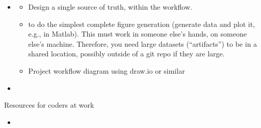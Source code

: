 \documentclass[letterpaper,10pt,english]{sphinxmanual}
\begin{document}
\begin{itemize}
\begin{description}
\begin{itemize}
\item {} 
\sphinxAtStartPar
Roughly 20\% of time “refactoring” (improving the code even if it’s working fine as is). An expression from software engineering is “technical debt”, the amount of disorganized clutter that slows future progress. How much time should you spend paying down technical debt (re\sphinxhyphen{}organizing your notes and directory structure, taking notes) versus producing results? This is called “refactoring”. We debated this percent a lot and this is the range that emerged.

\end{itemize}

\end{description}

\item {} \begin{description}
\begin{itemize}
\item {} 
\sphinxAtStartPar
Design a single source of truth, within the workflow.

\item {} 
\sphinxAtStartPar
{} to do the simplest complete figure generation (generate data and plot it, e.g., in Matlab). This must work in someone else’s hands, on someone else’s machine. Therefore, you need large datasets (“artifacts”) to be in a shared location, possibly outside of a git repo if they are large.

\item {} 
\sphinxAtStartPar
Project workflow diagram using draw.io or similar

\end{itemize}

\end{description}

\item {} \begin{description}
\end{description}

\end{itemize}

\sphinxAtStartPar
Resources for coders at work
\begin{itemize}
\item {} 
\sphinxAtStartPar
{}

\end{itemize}
\end{document}
